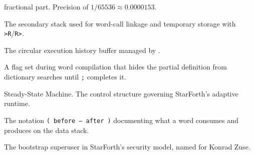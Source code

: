 \begin{description}
    fractional part. Precision of $1/65536 \approx 0.0000153$.
  \item[Return stack] The secondary stack used for word-call linkage and
    temporary storage with \texttt{>R}/\texttt{R>}.
  \item[Rolling window] The circular execution history buffer managed by
    .
  \item[SMUDGE] A flag set during word compilation that hides the partial
    definition from dictionary searches until \texttt{;} completes it.
  \item[SSM] Steady-State Machine. The control structure governing
    StarForth's adaptive runtime.
  \item[Stack effect] The notation \texttt{( before -- after )} documenting
    what a word consumes and produces on the data stack.
  \item[Zuse] The bootstrap superuser in StarForth's security model, named
    for Konrad Zuse.
\end{description}

\backmatter




